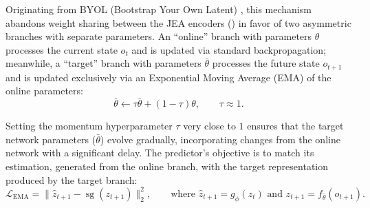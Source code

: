 \documentclass[11pt, oneside, openany]{book}
\DeclareMathOperator{\sg}{sg}
\begin{document}
Originating from BYOL (Bootstrap Your Own Latent) \cite{grill2020bootstrap}, this mechanism abandons weight sharing between the JEA encoders () in favor of two asymmetric branches with separate parameters. An ``online'' branch with parameters $\theta$ processes the current state $o_{t}$ and is updated via standard backpropagation; meanwhile, a ``target'' branch with parameters $\bar{\theta}$ processes the future state $o_{t+1}$ and is updated exclusively via an Exponential Moving Average (EMA) of the online parameters:
\begin{equation}
\label{eq:6.8}
\bar{\theta} \leftarrow \tau \bar{\theta} + (1 - \tau)\theta, \qquad \tau \approx 1.
\end{equation}

Setting the momentum hyperparameter $\tau$ very close to $1$ ensures that the target network parameters ($\bar{\theta}$) evolve gradually, incorporating changes from the online network with a significant delay. The predictor's objective is to match its estimation, generated from the online branch, with the target representation produced by the target branch:
\begin{equation}
\label{eq:6.9}
\mathcal{L}_{\text{EMA}} = \lVert \hat{z}_{t+1} - \sg(z_{t+1}) \rVert_{2}^{2}, \qquad \text{where } \hat{z}_{t+1} = g_{\phi}(z_{t}) \text{ and } z_{t+1} = f_{\bar{\theta}}(o_{t+1}).
\end{equation}
\end{document}
